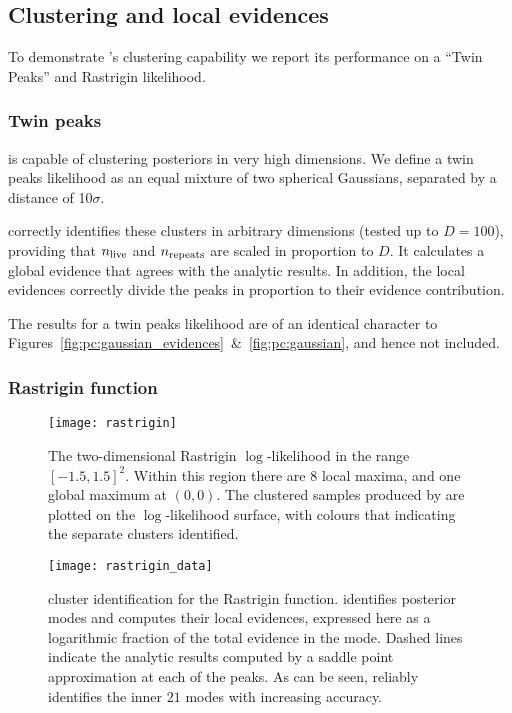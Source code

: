\subsection{Clustering and local evidences}
\label{sec:pc:loc_ev}
To demonstrate \PolyChord{}'s clustering capability we report its performance on a ``Twin Peaks'' and Rastrigin likelihood.

\subsubsection{Twin peaks}
\label{sec:pc:twin_peaks}
\PolyChord{} is capable of clustering posteriors in very high dimensions. We define a twin peaks likelihood as an equal mixture of two spherical Gaussians, separated by a distance of 10$\sigma$.

\PolyChord{} correctly identifies these clusters in arbitrary dimensions (tested up to $D=100$), providing that $n_{\mathrm{live}}$ and $n_{\mathrm{repeats}}$ are scaled in proportion to $D$. It calculates a global evidence that agrees with the analytic results. In addition, the local evidences correctly divide the peaks in proportion to their evidence contribution.

The results for a twin peaks likelihood are of an identical character to Figures~\ref{fig:pc:gaussian_evidences}~\&~\ref{fig:pc:gaussian}, and hence not included.

\subsubsection{Rastrigin function}
\label{sec:pc:rastrigin}

\begin{figure}
  \centering
  \texttt{[image: rastrigin]}
  \caption{The two-dimensional Rastrigin $\log$-likelihood in the range ${[-1.5,1.5]}^2$. Within this region there are $8$ local maxima, and one global maximum at $(0,0)$. The clustered samples produced by \PolyChord{} are plotted on the $\log$-likelihood surface, with colours that indicating the separate clusters identified.\label{fig:pc:rastrigin}}
\end{figure}

\begin{figure}
  \centering
  \texttt{[image: rastrigin\_data]}
  \caption{\PolyChord{} cluster identification for the Rastrigin function. \PolyChord{} identifies posterior modes and computes their local evidences, expressed here as a logarithmic fraction of  the total evidence in the mode. Dashed lines indicate the analytic results computed by a saddle point approximation at each of the peaks. As can be seen, \PolyChord{} reliably identifies the inner $21$ modes with increasing accuracy.\label{fig:pc:rastrigin_data}}
\end{figure}

